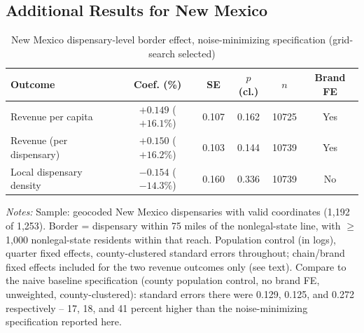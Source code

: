 \documentclass[english,12pt]{article}
\begin{document}
\subsection{Additional Results for New Mexico}
\label{app:nm}


\begin{table}[htbp]
\centering
\caption{New Mexico dispensary-level border effect, noise-minimizing specification (grid-search selected)}
\label{tab:nm_dispensary_border_best}
\footnotesize
\begin{tabular}{lccccc}
\toprule
Outcome & Coef. (\%) & SE & $p$ (cl.) & $n$ & Brand FE \\
\midrule
Revenue per capita & $+0.149$ ($+16.1\%$) & 0.107 & 0.162 & 10725 & Yes \\
Revenue (per dispensary) & $+0.150$ ($+16.2\%$) & 0.103 & 0.144 & 10739 & Yes \\
Local dispensary density & $-0.154$ ($-14.3\%$) & 0.160 & 0.336 & 10739 & No \\
\bottomrule
\end{tabular}
\begin{minipage}{0.98\textwidth}
\vspace{0.3em}
\footnotesize
\textit{Notes:} Sample: geocoded New Mexico dispensaries with valid coordinates (1,192 of 1,253). Border =
dispensary within 75 miles of the nonlegal-state line, with $\geq$1,000 nonlegal-state residents within that
reach. Population control (in logs), quarter fixed effects, county-clustered standard errors throughout;
chain/brand fixed effects included for the two revenue outcomes only (see text). Compare to the naive
baseline specification (county population control, no brand FE, unweighted, county-clustered): standard
errors there were 0.129, 0.125, and 0.272 respectively -- 17, 18, and 41 percent higher than the
noise-minimizing specification reported here.
\end{minipage}
\end{table}
\end{document}
